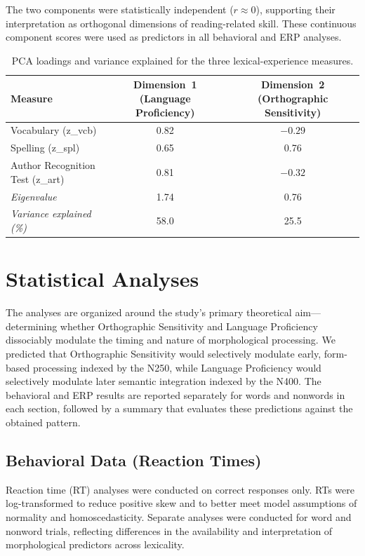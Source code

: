 \documentclass[utf8]{FrontiersinHarvard} %
\begin{document}
The two components were statistically independent ($r \approx 0$), supporting their interpretation as orthogonal dimensions of reading-related skill. These continuous component scores were used as predictors in all behavioral and ERP analyses.


\begin{table}[ht]
	\centering
	\caption{PCA loadings and variance explained for the three lexical-experience measures.}
	\label{tab:pca_loadings}
	\begin{tabular}{lcc}
		\toprule
		\textbf{Measure} & \textbf{Dimension~1 (Language Proficiency)} & \textbf{Dimension~2 (Orthographic Sensitivity)} \\
		\midrule
		Vocabulary (z\_vcb) & 0.82 & $-0.29$ \\
		Spelling (z\_spl) & 0.65 & 0.76 \\
		Author Recognition Test (z\_art) & 0.81 & $-0.32$ \\
		\midrule
		\textit{Eigenvalue} & 1.74 & 0.76 \\
		\textit{Variance explained (\%)} & 58.0 & 25.5 \\
		\bottomrule
	\end{tabular}
\end{table}

\section{Statistical Analyses}

The analyses are organized around the study’s primary theoretical aim—determining whether Orthographic Sensitivity and Language Proficiency dissociably modulate the timing and nature of morphological processing. We predicted that Orthographic Sensitivity would selectively modulate early, form-based processing indexed by the N250, while Language Proficiency would selectively modulate later semantic integration indexed by the N400. The behavioral and ERP results are reported separately for words and nonwords in each section, followed by a summary that evaluates these predictions against the obtained pattern.

\subsection{Behavioral Data (Reaction Times)}
Reaction time (RT) analyses were conducted on correct responses only. RTs were log-transformed to reduce positive skew and to better meet model assumptions of normality and homoscedasticity. Separate analyses were conducted for word and nonword trials, reflecting differences in the availability and interpretation of morphological predictors across lexicality.
\end{document}
